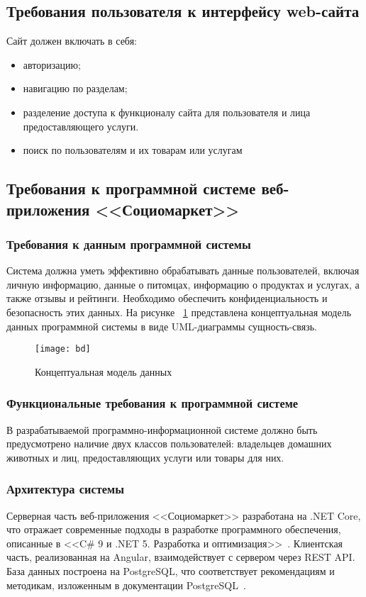 \subsection{Требования пользователя к интерфейсу web-сайта}

Сайт должен включать в себя:
\begin{itemize}
    \item авторизацию;
    \item навигацию по разделам;
    \item разделение доступа к функционалу сайта для пользователя и лица предоставляющего услуги.
    \item поиск по пользователям и их товарам или услугам
\end{itemize}


\subsection{Требования к программной системе веб-приложения <<Социомаркет>>}
\subsubsection{Требования к данным программной системы}
Система должна уметь эффективно обрабатывать данные пользователей, включая личную информацию, данные о питомцах, информацию о продуктах и услугах, а также отзывы и рейтинги. Необходимо обеспечить конфиденциальность и безопасность этих данных.
На рисунке ~\ref{bd:image} представлена концептуальная модель данных программной системы в виде UML-диаграммы сущность-связь.

\begin{figure}[ht]
\texttt{[image: bd]}
\caption{Концептуальная модель данных}
\label{bd:image}
\end{figure}

\subsubsection{Функциональные требования к программной системе}
В разрабатываемой программно-информационной системе должно быть предусмотрено наличие двух классов пользователей: владельцев домашних животных и лиц, предоставляющих услуги или товары для них.

\subsubsection{Архитектура системы} 
Серверная часть веб-приложения <<Социомаркет>> разработана на .NET Core, что отражает современные подходы в разработке программного обеспечения, описанные в <<C\# 9 и .NET 5. Разработка и оптимизация>>~\cite{mark_price}. Клиентская часть, реализованная на Angular, взаимодействует с сервером через REST API. База данных построена на PostgreSQL, что соответствует рекомендациям и методикам, изложенным в документации PostgreSQL~\cite{postgresql}.

